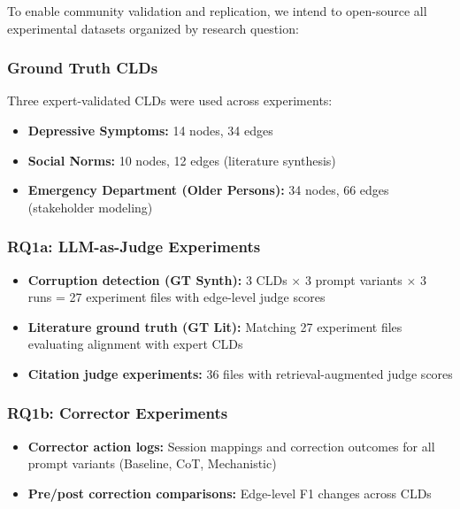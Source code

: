 To enable community validation and replication, we intend to open-source all experimental datasets organized by research question:

\subsubsection{Ground Truth CLDs}

Three expert-validated CLDs were used across experiments:
\begin{itemize}[noitemsep]
    \item \textbf{Depressive Symptoms:} 14 nodes, 34 edges~\citep{crielaard2024refining}
    \item \textbf{Social Norms:} 10 nodes, 12 edges (literature synthesis)
    \item \textbf{Emergency Department (Older Persons):} 34 nodes, 66 edges (stakeholder modeling)
\end{itemize}

\subsubsection{RQ1a: LLM-as-Judge Experiments}

\begin{itemize}[noitemsep]
    \item \textbf{Corruption detection (GT Synth):} 3 CLDs $\times$ 3 prompt variants $\times$ 3 runs = 27 experiment files with edge-level judge scores
    \item \textbf{Literature ground truth (GT Lit):} Matching 27 experiment files evaluating alignment with expert CLDs
    \item \textbf{Citation judge experiments:} 36 files with retrieval-augmented judge scores
\end{itemize}

\subsubsection{RQ1b: Corrector Experiments}

\begin{itemize}[noitemsep]
    \item \textbf{Corrector action logs:} Session mappings and correction outcomes for all prompt variants (Baseline, CoT, Mechanistic)
    \item \textbf{Pre/post correction comparisons:} Edge-level F1 changes across CLDs
\end{itemize}

